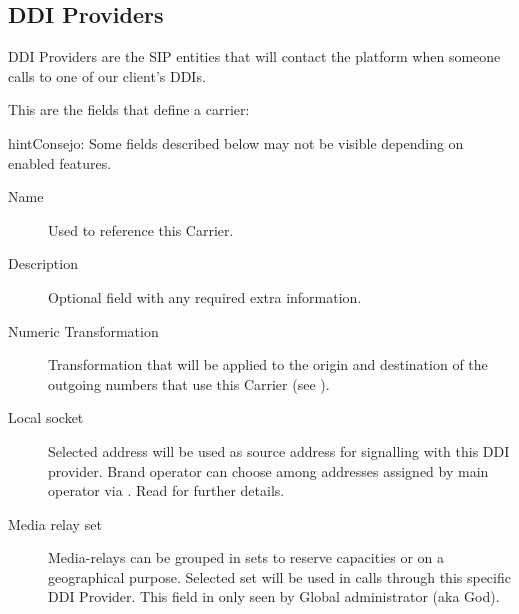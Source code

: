 \documentclass[letterpaper,10pt,spanish]{sphinxmanual}
\begin{document}
\subsection{DDI Providers}
\label{administration_portal/brand/providers/ddi_providers:ddi-providers}\label{administration_portal/brand/providers/ddi_providers::doc}
DDI Providers are the SIP entities that will contact the platform when someone calls to one of our client's DDIs.

This are the fields that define a carrier:

\begin{notice}{hint}{Consejo:}
Some fields described below may not be visible depending on enabled features.
\end{notice}
\begin{description}
\item[{Name}] \leavevmode{}\label{administration_portal/brand/providers/ddi_providers:term-name}
Used to reference this Carrier.

\item[{Description}] \leavevmode{}\label{administration_portal/brand/providers/ddi_providers:term-description}
Optional field with any required extra information.

\item[{Numeric Transformation}] \leavevmode{}\label{administration_portal/brand/providers/ddi_providers:term-numeric-transformation}
Transformation that will be applied to the origin and destination of the
outgoing numbers that use this Carrier
(see {\hyperref[administration_portal/brand/settings/numeric_transformations:numeric\string-transformations]{}}).

\item[{Local socket}] \leavevmode{}\label{administration_portal/brand/providers/ddi_providers:term-local-socket}
Selected address will be used as source address for signalling with this DDI provider. Brand operator can choose among
addresses assigned by main operator via {\hyperref[administration_portal/platform/brands:brands]{}}. Read {\hyperref[administration_portal/platform/infrastructure/proxy_trunks:proxy\string-trunks]{}} for further details.

\item[{Media relay set}] \leavevmode{}\label{administration_portal/brand/providers/ddi_providers:term-media-relay-set}
Media-relays can be grouped in sets to reserve capacities or on a geographical purpose. Selected set will be used
in calls through this specific DDI Provider. This field in only seen by Global administrator (aka God).

\end{description}
\end{document}
